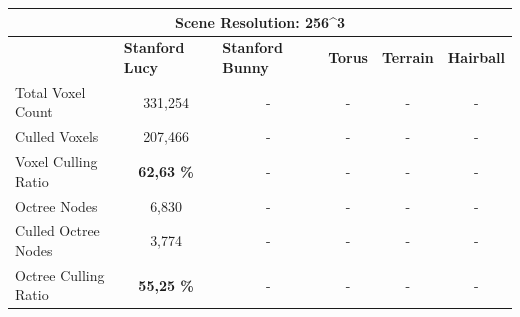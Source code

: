 \begin{table}[h]
    \begin{tabular}{|lccccc|}
    \hline
    \multicolumn{6}{|c|}{\textbf{Scene Resolution: 256\textasciicircum{}3}}                                                                                                                                                                                                         \\ \hline
    \multicolumn{1}{|l|}{}                          & \multicolumn{1}{|l|}{\textbf{Stanford Lucy}}  & \multicolumn{1}{l|}{\textbf{Stanford Bunny}}  & \multicolumn{1}{l|}{\textbf{Torus}}   & \multicolumn{1}{l|}{\textbf{Terrain}}     & \multicolumn{1}{l|}{\textbf{Hairball}}    \\ \hline
    \multicolumn{1}{|l|}{Total Voxel Count}         & \multicolumn{1}{c|}{331,254}                  & \multicolumn{1}{c|}{-}                        & \multicolumn{1}{c|}{-}                & \multicolumn{1}{c|}{-}                    & \multicolumn{1}{c|}{-}                    \\
    \multicolumn{1}{|l|}{Culled Voxels}             & \multicolumn{1}{c|}{207,466}                  & \multicolumn{1}{c|}{-}                        & \multicolumn{1}{c|}{-}                & \multicolumn{1}{c|}{-}                    & -                                         \\
    \multicolumn{1}{|l|}{Voxel Culling Ratio}       & \multicolumn{1}{c|}{\textbf{62,63 \%}}        & \multicolumn{1}{c|}{-}                        & \multicolumn{1}{c|}{-}                & \multicolumn{1}{c|}{-}                    & -                                         \\ \hline
    \multicolumn{1}{|l|}{Octree Nodes}              & \multicolumn{1}{c|}{6,830}                    & \multicolumn{1}{c|}{-}                        & \multicolumn{1}{c|}{-}                & \multicolumn{1}{c|}{-}                    & -                                         \\
    \multicolumn{1}{|l|}{Culled Octree Nodes}       & \multicolumn{1}{c|}{3,774}                    & \multicolumn{1}{c|}{-}                        & \multicolumn{1}{c|}{-}                & \multicolumn{1}{c|}{-}                    & -                                         \\
    \multicolumn{1}{|l|}{Octree Culling Ratio}      & \multicolumn{1}{c|}{\textbf{55,25 \%}}        & \multicolumn{1}{c|}{-}                        & \multicolumn{1}{c|}{-}                & \multicolumn{1}{c|}{-}                    & -                                         \\ \hline
    \end{tabular}
\end{table}


